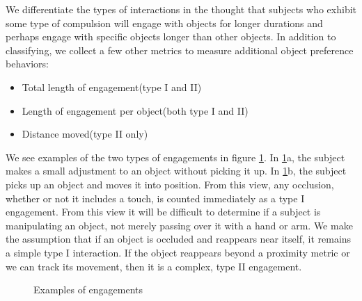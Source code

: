 \documentclass[11pt]{article}
\begin{document}
We differentiate the types of interactions in the thought that subjects who exhibit some type of compulsion will engage with objects for longer durations and perhaps engage with specific objects longer than other objects. In addition to classifying, we collect a few other metrics to measure additional object preference behaviors:
\begin{itemize}
\item Total length of engagement(type I and II)
\item Length of engagement per object(both type I and II)
\item Distance moved(type II only)
\end{itemize}
We see examples of the two types of engagements in figure \ref{engagement}. In \ref{engagement}a, the subject makes a small adjustment to an object without picking it up. In \ref{engagement}b, the subject picks up an object and moves it into position. From this view, any occlusion, whether or not it includes a touch, is counted immediately as a type I engagement. From this view it will be difficult to determine if a subject is manipulating an object, not merely passing over it with a hand or arm. We make the assumption that if an object is occluded and reappears near itself, it remains a simple type I interaction. If the object reappears beyond a proximity metric or we can track its movement, then it is a complex, type II engagement.
\begin{figure}%
    \centering
    \qquad
    \caption{Examples of engagements}%
    \label{engagement}%
\end{figure}
\end{document}
